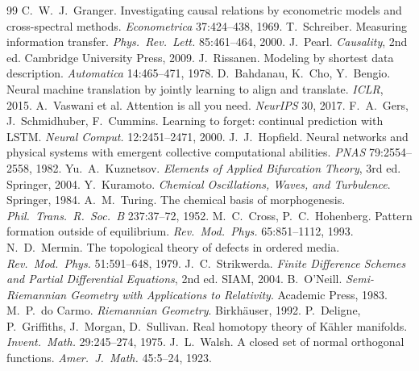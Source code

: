 \documentclass[11pt]{article}
\theoremstyle{definition}
\theoremstyle{remark}
\begin{document}
\begin{thebibliography}{99}
 C.\ W.\ J.\ Granger. Investigating causal relations by econometric models and cross-spectral methods. \emph{Econometrica} 37:424--438, 1969.
 T.\ Schreiber. Measuring information transfer. \emph{Phys.\ Rev.\ Lett.} 85:461--464, 2000.
 J.\ Pearl. \emph{Causality}, 2nd ed. Cambridge University Press, 2009.
 J.\ Rissanen. Modeling by shortest data description. \emph{Automatica} 14:465--471, 1978.
 D.\ Bahdanau, K.\ Cho, Y.\ Bengio. Neural machine translation by jointly learning to align and translate. \emph{ICLR}, 2015.
 A.\ Vaswani et al. Attention is all you need. \emph{NeurIPS} 30, 2017.
 F.\ A.\ Gers, J.\ Schmidhuber, F.\ Cummins. Learning to forget: continual prediction with LSTM. \emph{Neural Comput.} 12:2451--2471, 2000.
 J.\ J.\ Hopfield. Neural networks and physical systems with emergent collective computational abilities. \emph{PNAS} 79:2554--2558, 1982.
 Yu.\ A.\ Kuznetsov. \emph{Elements of Applied Bifurcation Theory}, 3rd ed. Springer, 2004.
 Y.\ Kuramoto. \emph{Chemical Oscillations, Waves, and Turbulence}. Springer, 1984.
 A.\ M.\ Turing. The chemical basis of morphogenesis. \emph{Phil.\ Trans.\ R.\ Soc.\ B} 237:37--72, 1952.
 M.\ C.\ Cross, P.\ C.\ Hohenberg. Pattern formation outside of equilibrium. \emph{Rev.\ Mod.\ Phys.} 65:851--1112, 1993.
 N.\ D.\ Mermin. The topological theory of defects in ordered media. \emph{Rev.\ Mod.\ Phys.} 51:591--648, 1979.
 J.\ C.\ Strikwerda. \emph{Finite Difference Schemes and Partial Differential Equations}, 2nd ed. SIAM, 2004.
 B.\ O'Neill. \emph{Semi-Riemannian Geometry with Applications to Relativity}. Academic Press, 1983.
 M.\ P.\ do Carmo. \emph{Riemannian Geometry}. Birkhäuser, 1992.
 P.\ Deligne, P.\ Griffiths, J.\ Morgan, D.\ Sullivan. Real homotopy theory of Kähler manifolds. \emph{Invent.\ Math.} 29:245--274, 1975.
 J.\ L.\ Walsh. A closed set of normal orthogonal functions. \emph{Amer.\ J.\ Math.} 45:5--24, 1923.
\end{thebibliography}
\end{document}
